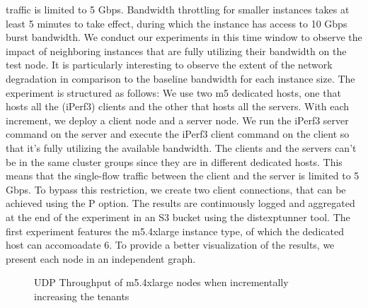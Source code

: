 traffic is limited to 5 Gbps. 
Bandwidth throttling for smaller instances takes at least 5 minutes to take effect, during which the instance
has access to 10 Gbps burst bandwidth. We conduct our experiments in this time window to observe the impact 
of neighboring instances that are fully utilizing their bandwidth on the test node. It is particularly 
interesting to observe the extent of the network degradation in comparison to the baseline bandwidth 
for each instance size. The experiment is structured as follows: We use two m5 dedicated hosts, one 
that hosts all the (iPerf3) clients and the other that hosts all the servers. With each increment, we deploy a 
client node and a server node. We run the iPerf3 server command on the server and execute the iPerf3 client 
command on the client so that it's fully utilizing the available bandwidth. The clients and the servers 
can't be in the same cluster groups since they are in different dedicated hosts. This means that the 
single-flow traffic between the client and the server is limited to 5 Gbps. To bypass this restriction, 
we create two client connections, that can be achieved using the P option. The results are continuously logged 
and aggregated at the end of the experiment in an S3 bucket using the distexptunner tool. The first experiment 
features the m5.4xlarge instance type, of which the dedicated host can accomoadate 6. To provide a better 
visualization of the results, we present each node in an independent graph. 
\begin{figure}[H]
\centering
{}
\caption{UDP Throughput of m5.4xlarge nodes when incrementally increasing the tenants}
\end{figure}

